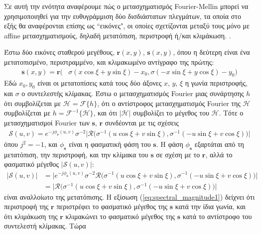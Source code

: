 Σε αυτή την ενότητα αναφέρουμε πώς ο μετασχηματισμός Fourier-Mellin μπορεί να
χρησιμοποιηθεί για την ευθυγράμμιση δύο δισδιάστατων πλεγμάτων, τα οποία στο
εξής θα αναφέρονται επίσης ως ``εικόνες", οι οποίες σχετίζονται μεταξύ τους μόνο
με affine μετασχηματισμούς, δηλαδή μετατόπιση, περιστροφή ή/και κλιμάκωση.
\cite{Casasent1976,Qin-ShengChen1994a,Reddy1996}.

Έστω δύο εικόνες σταθερού μεγέθους, $\bm{r}(x,y)$, $\bm{s}(x,y)$, όπου η
δεύτερη είναι ένα μετατοπισμένο, περιστραμμένο, και κλιμακωμένο αντίγραφο της
πρώτης:
\begin{align}
  \bm{s}(x,y) = \bm{r}\big( &\sigma(x \cos\xi + y \sin\xi) - x_0, \sigma(-x \sin\xi + y \cos\xi) -y_0 \big) \nonumber
\end{align}
Εδώ $x_0,y_0$ είναι οι μετατοπίσεις κατά τους δύο άξονες $x$, $y$, $\xi$ η
γωνία περιστροφής, και $\sigma$ ο συντελεστής κλίμακας. Έστω ο μετασχηματισμός
Fourier μιας συνάρτησης $h$ ότι συμβολίζεται με $\mathcal{H} =
\mathcal{F}\{h\}$, ότι ο αντίστροφος μετασχηματισμός Fourier της $\mathcal{H}$
συμβολίζεται με $h = \mathcal{F}^{-1}\{\mathcal{H}\}$, και ότι $|\mathcal{H}|$
συμβολίζει το μέγεθος του $\mathcal{H}$. Τότε ο μετασχηματισμοί Fourier των
$\bm{s}$, $\bm{r}$
συνδέονται με τις σχέσεις
\begin{align}
  \mathcal{S}(u,v) = e^{-j \phi_{\bm{s}}(u,v)} \sigma^{-2} \big| \mathcal{R} \big( \sigma^{-1}(u \cos\xi + v \sin\xi), \sigma^{-1}(-u \sin\xi + v \cos\xi) \big) \big| \nonumber
\end{align}
όπου $j^2 = -1$, και $\phi_{\bm{s}}$ είναι η φασματική φάση του $\bm{s}$.
Η φάση $\phi_{\bm{s}}$ εξαρτάται από τη μετατόπιση, την περιστροφή, και την
κλίμακα του $\bm{s}$ σε σχέση με το $\bm{r}$, αλλά το φασματικό μέγεθος
$|\mathcal{S}(u,v)|$:
\begin{align}
  \big| \mathcal{S}(u,v) \big| &= \big| e^{-j \phi_{\bm{s}}(u,v)} \sigma^{-2} \mathcal{R} \big( \sigma^{-1}(u \cos\xi + v \sin\xi),
                                                                        \sigma^{-1}(-u \sin\xi + v \cos\xi) \big) \big| \nonumber \\
  &= \big| \mathcal{R} \big( \sigma^{-1}(u \cos\xi + v \sin\xi), \sigma^{-1}(-u \sin\xi + v \cos\xi) \big) \big| \label{eq:spectral_magnitude1}
\end{align}
είναι αναλλοίωτο της μετατόπισης. Η εξίσωση (\ref{eq:spectral_magnitude1})
δείχνει ότι περιστροφή της $\bm{r}$ περιστρέφει το φασματικό μέγεθος της
$\bm{s}$ κατά την ίδια γωνία, και ότι κλιμάκωση της $\bm{r}$ κλιμακώνει το
φασματικό μέγεθος της $\bm{s}$ κατά το αντίστροφο του συντελεστή κλίμακας. Τώρα

